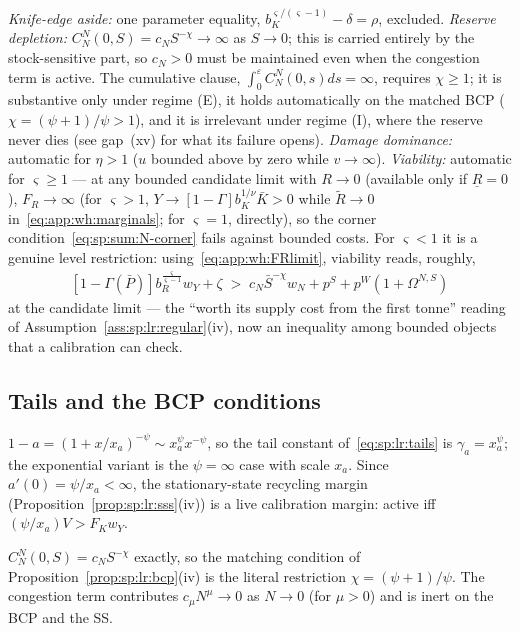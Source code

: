 \emph{Knife-edge aside:} one parameter equality,
$b_K^{\varsigma/\left(\varsigma-1\right)}-\delta=\rho$, excluded.
\emph{Reserve depletion:} $C^N_N\left(0,S\right)=c_NS^{-\chi}\to\infty$ as $S\to0$; this is
carried entirely by the stock-sensitive part, so $c_N>0$ must be maintained even when the
congestion term is active. The cumulative clause,
$\int_0^\varepsilon C^N_N\left(0,s\right)ds=\infty$, requires $\chi\ge1$; it is substantive
only under regime (E), it holds automatically on the matched BCP
($\chi=\left(\psi+1\right)/\psi>1$), and it is irrelevant under regime (I), where the
reserve never dies (see gap~(xv) for what its failure opens). \emph{Damage dominance:} automatic for $\eta>1$ ($u$ bounded above
by zero while $v\to\infty$). \emph{Viability:} automatic for $\varsigma\ge1$ --- at any
bounded candidate limit with $R\to0$ (available only if $\underline R=0$), $F_R\to\infty$
(for $\varsigma>1$, $Y\to\left[1-\Gamma\right]b_K^{1/\nu}\bar K>0$ while
$\tilde R\to0$ in~\eqref{eq:app:wh:marginals}; for $\varsigma=1$, directly), so the corner
condition~\eqref{eq:sp:sum:N-corner} fails against bounded costs. For $\varsigma<1$ it is a
genuine level restriction: using~\eqref{eq:app:wh:FRlimit}, viability reads, roughly,
\begin{align}
\left[1-\Gamma\!\left(\bar P\right)\right]b_R^{\frac{\varsigma}{\varsigma-1}}w_Y+\zeta
\;>\;
c_N\bar S^{-\chi}w_N+p^S+p^W\left(1+\Omega^{N,S}\right)
\label{eq:app:wh:viability}
\end{align}
at the candidate limit --- the ``worth its supply cost from the first tonne'' reading of
Assumption~\ref{ass:sp:lr:regular}(iv), now an inequality among bounded objects that a
calibration can check.

\subsection{Tails and the BCP conditions}\label{sec:app:workhorse:tails}

 $1-a=\left(1+x/x_a\right)^{-\psi}\sim x_a^{\psi}x^{-\psi}$, so
the tail constant of~\eqref{eq:sp:lr:tails} is $\gamma_a=x_a^{\psi}$; the exponential variant
is the $\psi=\infty$ case with scale $x_a$. Since $a'\!\left(0\right)=\psi/x_a<\infty$, the
stationary-state recycling margin (Proposition~\ref{prop:sp:lr:sss}(iv)) is a live
calibration margin: active iff $\left(\psi/x_a\right)V>F_Kw_Y$.

 $C^N_N\left(0,S\right)=c_NS^{-\chi}$ exactly, so the matching
condition of Proposition~\ref{prop:sp:lr:bcp}(iv) is the literal restriction
$\chi=\left(\psi+1\right)/\psi$. The congestion term contributes $c_\mu N^{\mu}\to0$ as
$N\to0$ (for $\mu>0$) and is inert on the BCP and the SS.

